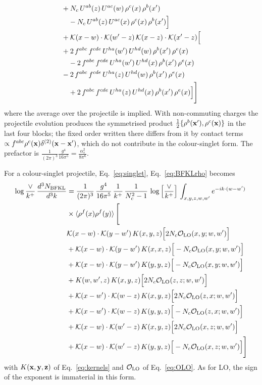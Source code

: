 \begin{align}
& +N_{c}\,U^{ab}(z)\,U^{ac}(w)\,\rho^{c}(x)\,\rho^{b}(x') \notag\\
&\quad -N_{c}\,U^{ab}(z)\,U^{ac}(x)\,\rho^{c}(x)\,\rho^{b}(x')\Big]\notag\\
& +\mathcal{K}(x-w)\cdot\mathcal{K}(w'-z)\,\mathcal{K}(x-z)\cdot\mathcal{K}(x'-z)\Big[\notag\\
& +2\,f^{abc}\,f^{cde}\,U^{ha}(w')\,U^{hd}(w)\,\rho^{b}(x')\,\rho^{e}(x)\notag\\&\quad -2\,f^{abc}\,f^{cde}\,U^{ha}(w')\,U^{hd}(x)\,\rho^{b}(x')\,\rho^{e}(x)\notag\\
& -2\,f^{abc}\,f^{cde}\,U^{ha}(z)\,U^{hd}(w)\,\rho^{b}(x')\,\rho^{e}(x) \notag\\
&\quad +2\,f^{abc}\,f^{cde}\,U^{ha}(z)\,U^{hd}(x)\,\rho^{b}(x')\,\rho^{e}(x)\Big]\Bigg]
\end{align}
where the average over the projectile is implied. With non-commuting charges the projectile evolution produces the symmetrised product $\frac12\{\rho^b(\mathbf{x}'),\rho^c(\mathbf{x})\}$ in the last four blocks; the fixed order written there differs from it by contact terms $\propto f^{abc}\rho^c(\mathbf{x})\delta^{(2)}(\mathbf{x}-\mathbf{x}')$, which do not contribute in the colour-singlet form. The prefactor is $\frac{1}{(2\pi)^3}\frac{g^4}{16\pi^5}=\frac{\alpha_s^2}{8\pi^6}$.

For a colour-singlet projectile, Eq.~\eqref{eq:singlet}, Eq.~\eqref{eq:BFKLrho} becomes
\begin{align}\label{eq:BFKLsinglet}
\log\frac{\vee}{k^+}\,\frac{d^{3}N_{\rm BFKL}}{d^{3}k} & = \frac{1}{(2\pi)^{3}}\,\frac{g^{4}}{16\pi^{5}}\,\frac{1}{k^{+}}\,\frac{1}{N^{2}_{c}-1}\,\log\Big[\frac{\vee}{k^{+}}\Big]\,\int_{x,y,z,w,w'}e^{-ik\cdot (w-w')}\notag\\&\times\langle\rho^{f}(x)\rho^{f}(y) \rangle\,\Bigg[ \notag\\ & \mathcal K(x-w)\cdot\mathcal K(y-w')\,K(x,y,z)\Big[2 N_{c}\mathcal O_{\rm LO}(x,y;w,w')\Big]\notag\\
&+\mathcal K(x-w)\cdot\mathcal K(y-w')\,K(x,x,z)\Big[-N_{c}\mathcal O_{\rm LO}(x,y;w,w')\Big]\notag\\
&+\mathcal K(x-w)\cdot\mathcal K(y-w')\,K(y,y,z)\Big[-N_{c}\mathcal O_{\rm LO}(x,y;w,w')\Big]\notag\\
&+K(w,w',z)\,K(x,y,z)\Big[2 N_{c}\mathcal O_{\rm LO}(z,z;w,w')\Big]\notag\\
&+\mathcal K(x-w')\cdot\mathcal K(w-z)\,K(x,y,z)\Big[2 N_{c}\mathcal O_{\rm LO}(z,x;w,w')\Big]\notag\\
&+\mathcal K(x-w')\cdot\mathcal K(w-z)\,K(y,y,z)\Big[-N_{c}\mathcal O_{\rm LO}(z,x;w,w')\Big]\notag\\
&+\mathcal K(x-w)\cdot\mathcal K(w'-z)\,K(x,y,z)\Big[2 N_{c}\mathcal O_{\rm LO}(x,z;w,w')\Big]\notag\\
&+\mathcal K(x-w)\cdot\mathcal K(w'-z)\,K(y,y,z)\Big[-N_{c}\mathcal O_{\rm LO}(x,z;w,w')\Big]\Bigg]
\end{align}
with $K(\mathbf{x},\mathbf{y},\mathbf{z})$ of Eq.~\eqref{eq:kernels} and $\mathcal O_{\rm LO}$ of Eq.~\eqref{eq:OLO}. As for LO, the sign of the exponent is immaterial in this form.

